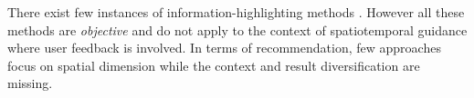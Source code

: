 
There exist few instances of information-highlighting methods \cite{Liang2010,Robinson2011,wongsuphasawat2016voyager,willett2007scented}. However all these methods are {\em objective} and do not apply to the context of spatiotemporal guidance where user feedback is involved.  In terms of recommendation, few approaches focus on spatial dimension
\cite{Bao2015,Levandoski:2012}
while the context and result diversification are missing.




